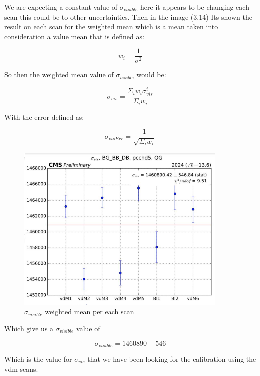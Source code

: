 We are expecting a constant value of $\sigma_{visible}$ here it appears to be changing each scan this could be to other uncertainties. Then in the image (3.14) Its shown the result on each scan for the weighted mean which is a mean taken into consideration a value mean that is defined as:

\begin{equation}
w_{i}=\frac{1}{\sigma^{2}}
\end{equation}

So then the weighted mean value of $\sigma_{visible}$ would be:

\begin{equation}
\sigma_{vis} = \frac {\Sigma_{i} w_{i} \sigma^{i}_{vis}}{\Sigma_{i} w_{i}} 
\end{equation}

With the error defined as:

\begin{equation}
\sigma_{visErr} = \frac{1}{\sqrt{\Sigma_{i} w_{i}}}
\end{equation}

\begin{figure}[H]
    \centering
    \includegraphics[width=0.9\textwidth]{sigscan.png}
    \caption{$\sigma_{visible}$ weighted mean per each scan}
    \label{fig:sigscan}
\end{figure}

Which give us a $\sigma_{visible}$ value of 

\begin{equation}
\sigma_{visible} = 1460890 \pm 546
\end{equation}

Which is the value for $\sigma_{vis}$ that we have been looking for the calibration using the vdm scans.

